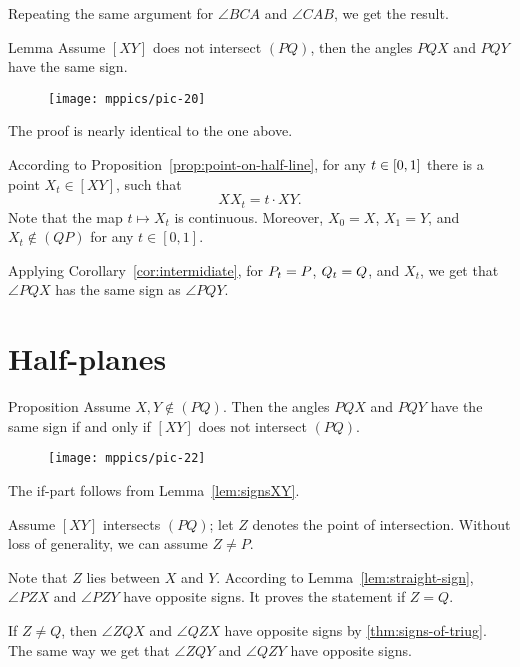 Repeating the same argument for $\angle BCA$ and $\angle CAB$,
we get the result.
\qeds

\begin{thm}[\abs]{Lemma}\label{lem:signsXY}
Assume $[XY]$ does not intersect $(PQ)$,
then the angles $PQX$ and $PQY$ 
have the same sign.
\end{thm}

\begin{wrapfigure}{o}{26mm}
\vskip-4mm
\centering
\texttt{[image: mppics/pic-20]}
\end{wrapfigure}

The proof is nearly identical to the one above.

According to Proposition~\ref{prop:point-on-half-line},
for any $t\z\in [0,1]$ there is a point  $X_t\in[XY]$, 
such that 
\[XX_t= t\cdot XY.\]
Note that the map $t\mapsto X_t$ is continuous.
Moreover, $X_0=X$, $X_1=Y$, and $X_t\notin(QP)$ for any $t\in [0,1]$.

Applying Corollary~\ref{cor:intermidiate},
for $P_t\z=P$, $Q_t\z=Q$, and $X_t$, we get that
$\angle PQX$ has the same sign as $\angle PQY$.
\qeds



\section*{Half-planes}

\begin{thm}{Proposition}\label{prop:half-plane}
Assume $X,Y\notin(PQ)$.
Then the angles $PQX$ and $PQY$ have the same sign if and only if $[XY]$ does not intersect $(PQ)$.
\end{thm}

\begin{wrapfigure}{o}{30mm}
\texttt{[image: mppics/pic-22]}
\centering
\end{wrapfigure}

 The if-part follows from Lemma~\ref{lem:signsXY}. 

Assume $[XY]$ intersects $(PQ)$;
let $Z$ denotes the point of intersection.
Without loss of generality, we can assume $Z\ne P$.

Note that $Z$ lies between $X$ and $Y$.
According to Lemma~\ref{lem:straight-sign}, $\angle PZX$ and $\angle PZY$ have opposite signs.
It proves the statement if $Z=Q$.

If $Z\ne Q$, then $\angle ZQX$ and $\angle QZX$ have opposite signs by \ref{thm:signs-of-triug}.
The same way we get that $\angle ZQY$ and $\angle QZY$ have opposite signs.


